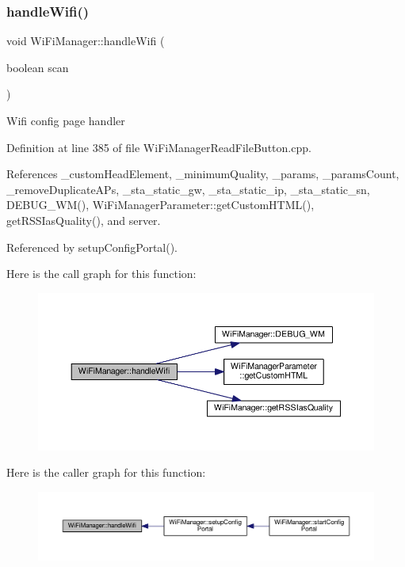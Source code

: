 \subsubsection{\texorpdfstring{handle\+Wifi()}{handleWifi()}}
{\footnotesize\ttfamily void Wi\+Fi\+Manager\+::handle\+Wifi (\begin{DoxyParamCaption}\item[{boolean}]{scan }\end{DoxyParamCaption})\hspace{0.3cm}{\ttfamily [private]}}

Wifi config page handler 

Definition at line 385 of file Wi\+Fi\+Manager\+Read\+File\+Button.\+cpp.



References \+\_\+custom\+Head\+Element, \+\_\+minimum\+Quality, \+\_\+params, \+\_\+params\+Count, \+\_\+remove\+Duplicate\+A\+Ps, \+\_\+sta\+\_\+static\+\_\+gw, \+\_\+sta\+\_\+static\+\_\+ip, \+\_\+sta\+\_\+static\+\_\+sn, D\+E\+B\+U\+G\+\_\+\+W\+M(), Wi\+Fi\+Manager\+Parameter\+::get\+Custom\+H\+T\+M\+L(), get\+R\+S\+S\+Ias\+Quality(), and server.



Referenced by setup\+Config\+Portal().

Here is the call graph for this function\+:
\nopagebreak
\begin{figure}[H]
\begin{center}
\leavevmode
\includegraphics[width=350pt]{d4/dc8/class_wi_fi_manager_a57a9048175c1918340ab9d0a2c53601f_cgraph}
\end{center}
\end{figure}
Here is the caller graph for this function\+:
\nopagebreak
\begin{figure}[H]
\begin{center}
\leavevmode
\includegraphics[width=350pt]{d4/dc8/class_wi_fi_manager_a57a9048175c1918340ab9d0a2c53601f_icgraph}
\end{center}
\end{figure}
\mbox{\label{class_wi_fi_manager_a2a8c2b60aa86dfdeab8a1a90f7122dc7}} 
